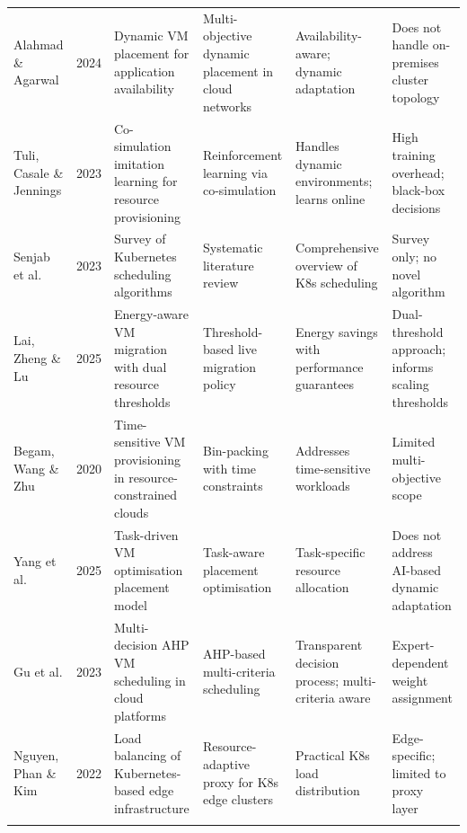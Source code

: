 \documentclass[12pt,a4paper]{report}
\begin{document}
\begin{longtable}{L{2.2cm} C{1cm} L{3.2cm} L{2.8cm} L{2.5cm} L{2.8cm}}
Alahmad \& Agarwal \cite{alahmad2024multiple}
  & 2024
  & Dynamic VM placement for application availability
  & Multi-objective dynamic placement in cloud networks
  & Availability-aware; dynamic adaptation
  & Does not handle on-premises cluster topology \\
\addlinespace

Tuli, Casale \& Jennings \cite{tuli2023cilp}
  & 2023
  & Co-simulation imitation learning for resource provisioning
  & Reinforcement learning via co-simulation
  & Handles dynamic environments; learns online
  & High training overhead; black-box decisions \\
\addlinespace

Senjab et al. \cite{senjab2023survey}
  & 2023
  & Survey of Kubernetes scheduling algorithms
  & Systematic literature review
  & Comprehensive overview of K8s scheduling
  & Survey only; no novel algorithm \\
\addlinespace

Lai, Zheng \& Lu \cite{lai2025energy}
  & 2025
  & Energy-aware VM migration with dual resource thresholds
  & Threshold-based live migration policy
  & Energy savings with performance guarantees
  & Dual-threshold approach; informs scaling thresholds \\
\addlinespace

Begam, Wang \& Zhu \cite{begam2020timer}
  & 2020
  & Time-sensitive VM provisioning in resource-constrained clouds
  & Bin-packing with time constraints
  & Addresses time-sensitive workloads
  & Limited multi-objective scope \\
\addlinespace

Yang et al. \cite{yang2025task}
  & 2025
  & Task-driven VM optimisation placement model
  & Task-aware placement optimisation
  & Task-specific resource allocation
  & Does not address AI-based dynamic adaptation \\
\addlinespace

Gu et al. \cite{gu2023towards}
  & 2023
  & Multi-decision AHP VM scheduling in cloud platforms
  & AHP-based multi-criteria scheduling
  & Transparent decision process; multi-criteria aware
  & Expert-dependent weight assignment \\
\addlinespace

Nguyen, Phan \& Kim \cite{nguyen2022load}
  & 2022
  & Load balancing of Kubernetes-based edge infrastructure
  & Resource-adaptive proxy for K8s edge clusters
  & Practical K8s load distribution
  & Edge-specific; limited to proxy layer \\
\addlinespace


\end{longtable}
\end{document}
